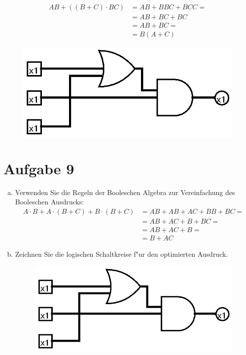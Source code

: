 \documentclass[10pt, oneside]{article}
\begin{document}
\begin{align*}
    AB + ((B + C) \cdot BC) &= AB + BBC + BCC = \\
                            &= AB + BC + BC \\
                            &= AB + BC = \\
                            &= B(A + C)
\end{align*}
\begin{figure}[h]
    \centering
    \includegraphics[scale=0.25]{./8-1.png}
\end{figure}

\section{Aufgabe 9}
\begin{enumerate}[(a)]
    \item Verwenden Sie die Regeln der Booleschen Algebra zur Vereinfachung des
        Booleschen Ausdrucks:
        \begin{align*}
            A \cdot B + A \cdot (B + C) + B \cdot (B + C) &= AB + AB + AC + BB + BC = \\
                                                          &= AB + AC + B + BC = \\
                                                          &= AB + AC + B = \\
                                                          &= B + AC
        \end{align*}
    \item Zeichnen Sie die logischen Schaltkreise f"ur den optimierten Ausdruck.
        \begin{figure}[h]
            \centering
            \includegraphics[scale=0.25]{./8-1.png}
        \end{figure}
\end{enumerate}
\end{document}

